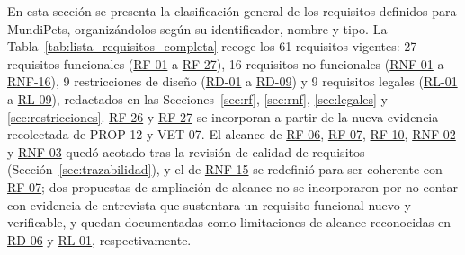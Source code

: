 \documentclass[journal,onecolumn]{IEEEtran}
\begin{document}
	En esta sección se presenta la clasificación general de los requisitos
	definidos para MundiPets, organizándolos según su identificador, nombre y
	tipo. La Tabla~\ref{tab:lista_requisitos_completa} recoge los 61 requisitos
	vigentes: 27 requisitos funcionales (\hyperref[tab:RF-01]{RF-01} a \hyperref[tab:RF-27]{RF-27}),
	16 requisitos no funcionales (\hyperref[tab:RNF-01]{RNF-01} a \hyperref[tab:RNF-16]{RNF-16}), 9 restricciones de diseño
	(\hyperref[tab:RD-01]{RD-01} a \hyperref[tab:RD-09]{RD-09}) y 9 requisitos legales (\hyperref[rl:01]{RL-01} a \hyperref[rl:09]{RL-09}), redactados en las
	Secciones~\ref{sec:rf}, \ref{sec:rnf}, \ref{sec:legales} y
	\ref{sec:restricciones}. \hyperref[tab:RF-26]{RF-26} y \hyperref[tab:RF-27]{RF-27} se incorporan a partir de la nueva
	evidencia recolectada de PROP-12 y VET-07. El alcance de \hyperref[tab:RF-06]{RF-06}, \hyperref[tab:RF-07]{RF-07},
	\hyperref[tab:RF-10]{RF-10}, \hyperref[tab:RNF-02]{RNF-02} y \hyperref[tab:RNF-03]{RNF-03} quedó acotado tras la revisión de calidad de
	requisitos (Sección~\ref{sec:trazabilidad}), y el de \hyperref[tab:RNF-15]{RNF-15} se redefinió
	para ser coherente con \hyperref[tab:RF-07]{RF-07}; dos propuestas de ampliación de alcance no se
	incorporaron por no contar con evidencia de entrevista que sustentara un
	requisito funcional nuevo y verificable, y quedan documentadas como
	limitaciones de alcance reconocidas en \hyperref[tab:RD-06]{RD-06} y \hyperref[rl:01]{RL-01}, respectivamente.
	
\end{document}
